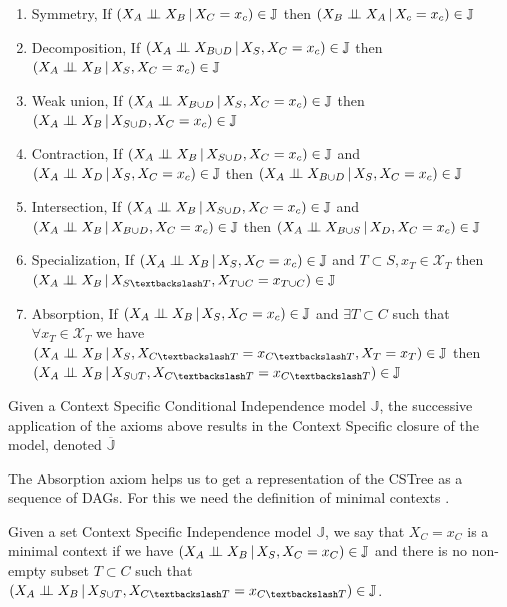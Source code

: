\documentclass{tufte-book}
\begin{document}
\begin{enumerate}
\item Symmetry, If \((X_A \perp \!\!\! \perp X_B \,|\, X_C=x_c) \in \mathbb{J}\) then \((X_B \perp \!\!\! \perp X_A \,|\, X_c=x_c) \in \mathbb{J}\)
\item Decomposition, If \((X_A \perp \!\!\! \perp X_{B \cup D} \,|\, X_S, X_C=x_c) \in \mathbb{J}\) then \((X_A \perp \!\!\! \perp X_B \,|\, X_S, X_C=x_c) \in \mathbb{J}\)
\item Weak union, If \((X_A \perp \!\!\! \perp X_{B \cup D} \,|\, X_S, X_C=x_c) \in \mathbb{J}\) then \((X_A \perp \!\!\! \perp X_{B} \,|\, X_{S \cup D}, X_C=x_c) \in \mathbb{J}\)
\item Contraction, If \((X_A \perp \!\!\! \perp X_B \,|\, X_{S \cup D}, X_C=x_c) \in \mathbb{J}\) and \((X_A \perp \!\!\! \perp X_D \,|\,X_S, X_C=x_c) \in \mathbb{J}\) then \((X_A \perp \!\!\! \perp X_{B \cup D} \,|\, X_S, X_C=x_c) \in \mathbb{J}\)
\item Intersection,  If \((X_A \perp \!\!\! \perp X_B \,|\, X_{S \cup D}, X_C=x_c) \in \mathbb{J}\) and  \((X_A \perp \!\!\! \perp X_B \,|\, X_{B \cup D}, X_C=x_c) \in \mathbb{J}\) then  \((X_A \perp \!\!\! \perp X_{B \cup S} \,|\, X_D, X_C=x_c) \in \mathbb{J}\)
\item Specialization, If \((X_A \perp \!\!\! \perp X_B \,|\, X_S, X_C=x_c) \in \mathbb{J}\) and \(T \subset S, x_T \in \mathcal{X}_T\) then \((X_A \indep X_B \,|\, X_{S \textbackslash T}, X_{T \cup C} = x_{T \cup C}) \in \mathbb{J}\)
\item Absorption, If \((X_A \perp \!\!\! \perp X_B \,|\, X_S, X_C=x_c) \in \mathbb{J}\) and \(\exists T \subset C\) such that \(\forall x_T \in \mathcal{X}_T\) we have \((X_A \indep X_B \,|\, X_S, X_{C\textbackslash T}=x_{C \textbackslash T}, X_T=x_T) \in \mathbb{J}\) then \((X_A \indep X_B \,|\, X_{S \cup T}, X_{C \textbackslash T}=x_{C \textbackslash T}) \in \mathbb{J}\)
\end{enumerate}


Given a Context Specific Conditional Independence model \(\mathbb{J}\), the successive application of the axioms above results in the Context Specific closure  of the model, denoted \(\mathbb{\overline{J}}\)


The Absorption axiom helps us to get a representation of the CSTree as a sequence of DAGs. For this we need the definition of minimal contexts \cite{duarte-2021-repres-learn}.
\begin{definition}\label{def:mcs}
Given a set Context Specific Independence model $\mathbb{J}$, we say that ${X_C=x_C}$ is a minimal context if we have $(X_A  \perp \!\!\! \perp X_B \,|\, X_S, X_C=x_C) \in \mathbb{J}$ and there is no non-empty subset $T \subset C$ such that $(X_A \indep X_B \,|\, X_{S \cup T}, X_{C \textbackslash T}=x_{C\textbackslash T}) \in \mathbb{J}$.
\end{definition}
\end{document}
